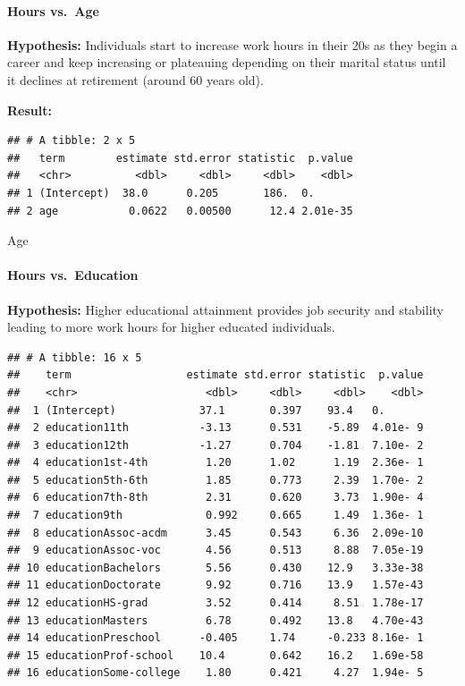 \documentclass[]{article}
\let\oldparagraph\paragraph
\renewcommand{\paragraph}[1]{\oldparagraph{#1}\mbox{}}
\begin{document}
\hypertarget{hours-vs.age}{%
\paragraph{Hours vs.~Age}\label{hours-vs.age}}

\textbf{Hypothesis:} Individuals start to increase work hours in their
20s as they begin a career and keep increasing or plateauing depending
on their marital status until it declines at retirement (around 60 years
old).

\textbf{Result:}

\begin{verbatim}
## # A tibble: 2 x 5
##   term        estimate std.error statistic  p.value
##   <chr>          <dbl>     <dbl>     <dbl>    <dbl>
## 1 (Intercept)  38.0      0.205       186.  0.      
## 2 age           0.0622   0.00500      12.4 2.01e-35
\end{verbatim}

Age

\hypertarget{hours-vs.education}{%
\paragraph{Hours vs.~Education}\label{hours-vs.education}}

\textbf{Hypothesis:} Higher educational attainment provides job security
and stability leading to more work hours for higher educated
individuals.

\begin{verbatim}
## # A tibble: 16 x 5
##    term                  estimate std.error statistic  p.value
##    <chr>                    <dbl>     <dbl>     <dbl>    <dbl>
##  1 (Intercept)             37.1       0.397    93.4   0.      
##  2 education11th           -3.13      0.531    -5.89  4.01e- 9
##  3 education12th           -1.27      0.704    -1.81  7.10e- 2
##  4 education1st-4th         1.20      1.02      1.19  2.36e- 1
##  5 education5th-6th         1.85      0.773     2.39  1.70e- 2
##  6 education7th-8th         2.31      0.620     3.73  1.90e- 4
##  7 education9th             0.992     0.665     1.49  1.36e- 1
##  8 educationAssoc-acdm      3.45      0.543     6.36  2.09e-10
##  9 educationAssoc-voc       4.56      0.513     8.88  7.05e-19
## 10 educationBachelors       5.56      0.430    12.9   3.33e-38
## 11 educationDoctorate       9.92      0.716    13.9   1.57e-43
## 12 educationHS-grad         3.52      0.414     8.51  1.78e-17
## 13 educationMasters         6.78      0.492    13.8   4.70e-43
## 14 educationPreschool      -0.405     1.74     -0.233 8.16e- 1
## 15 educationProf-school    10.4       0.642    16.2   1.69e-58
## 16 educationSome-college    1.80      0.421     4.27  1.94e- 5
\end{verbatim}
\end{document}
